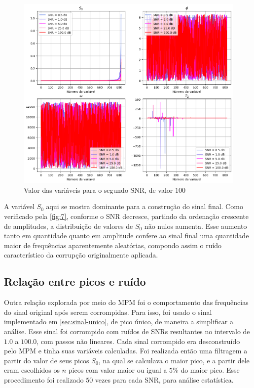 \documentclass[12pt]{article}
\begin{document}
\begin{figure} [H]
    \centering
    \includegraphics[scale=0.625]{vars-total.png}
    \caption{Valor das variáveis para o segundo SNR, de valor $100$}
    \label{fig:7}
\end{figure}

A variável $S_0$ aqui se mostra dominante para a construção do sinal final. Como verificado pela \autoref{fig:7}, conforme o SNR decresce, partindo da ordenação 
crescente de amplitudes, a distribuição de valores de $S_0$ não nulos aumenta. Esse aumento tanto em quantidade quanto em amplitude confere ao sinal final uma 
quantidade maior de frequências aparentemente aleatórias, compondo assim o ruído característico da corrupção originalmente aplicada.

\subsection{Relação entre picos e ruído}

Outra relação explorada por meio do MPM foi o comportamento das frequências do sinal original após serem corrompidas. Para isso, foi usado o sinal implementado em
\autoref{sec:sinal-unico}, de pico único, de maneira a simplificar a análise. Esse sinal foi corrompido com ruídos de SNRs resultantes no intervalo de 
$1.0$ a $100.0$, com passos não lineares. Cada sinal corrompido era desconstruído pelo MPM e tinha suas variáveis calculadas. Foi realizada então uma filtragem a 
partir do valor de seus picos $S_0$, na qual se calculava o maior pico, e a partir dele eram escolhidos os $n$ picos com valor maior ou igual a $5\%$ do maior pico. 
Esse procedimento foi realizado $50$ vezes para cada SNR, para análise estatística.
\end{document}

